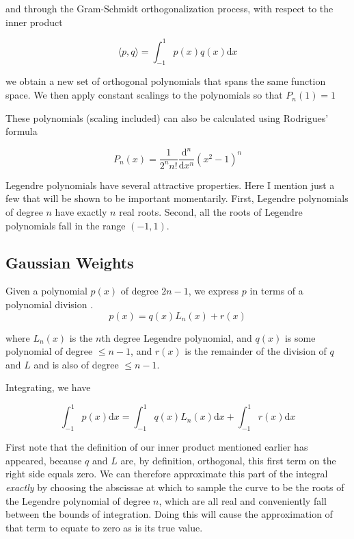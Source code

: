 and through the Gram-Schmidt orthogonalization process, with respect to the inner product

\begin{equation} \langle p,q \rangle = \int^1_{-1} p(x) q(x) \mathrm{d}x \end{equation}

we obtain a new set of orthogonal polynomials that spans the same function space. We then apply constant scalings to the polynomials so that \(P_n(1) = 1\)

These polynomials (scaling included) can also be calculated using Rodrigues' formula

\begin{equation}  P_n(x) = \frac{1}{2^n n!} \frac{\mathrm{d}^n}{\mathrm{d}x^n} \left(x^2 - 1 \right) ^n  \end{equation}

Legendre polynomials have several attractive properties. Here I mention just a few that will be shown to be important momentarily.  First, Legendre polynomials of degree $n$ have exactly $n$ real roots. Second, all the roots of Legendre polynomials fall in the range $(-1,1)$.

\subsection{Gaussian Weights}

Given a polynomial $p(x)$ of degree $2n-1$, we express $p$ in terms of a polynomial division
.
\begin{equation} p(x) = q(x) L_n(x) + r(x) \end{equation}

where $L_n(x)$ is the $n$th degree Legendre polynomial, and $q(x)$ is some polynomial of degree $\leq n-1$, and $r(x)$ is the remainder of the division of $q$ and $L$ and is also of degree $\leq n-1$.

Integrating, we have

\begin{equation} \int_{-1}^{1} p(x) \mathrm{d}x = \int_{-1}^{1} q(x) L_n(x) \mathrm{d}x + \int_{-1}^{1} r(x) \mathrm{d}x \end{equation}

First note that the definition of our inner product mentioned earlier has appeared, because $q$ and $L$ are, by definition, orthogonal, this first term on the right side equals zero.  We can therefore approximate this part of the integral \textit{exactly} by choosing the abscissae at which to sample the curve to be the roots of the Legendre polynomial of degree $n$, which are all real and conveniently fall between the bounds of integration.  Doing this will cause the approximation of that term to equate to zero as is its true value.


